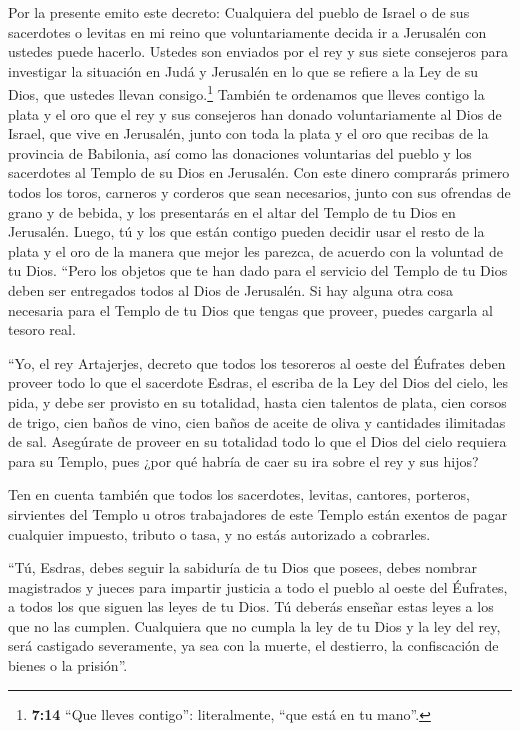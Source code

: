  Por la presente emito este decreto: Cualquiera del
pueblo de Israel o de sus sacerdotes o levitas en mi reino que
voluntariamente decida ir a Jerusalén con ustedes puede hacerlo.
 Ustedes son enviados por el rey y sus siete consejeros
para investigar la situación en Judá y Jerusalén en lo que se refiere a
la Ley de su Dios, que ustedes llevan consigo.\footnote{\textbf{7:14}
  ``Que lleves contigo'': literalmente, ``que está en tu mano''.}
 También te ordenamos que lleves contigo la plata y el
oro que el rey y sus consejeros han donado voluntariamente al Dios de
Israel, que vive en Jerusalén,  junto con toda la plata y
el oro que recibas de la provincia de Babilonia, así como las donaciones
voluntarias del pueblo y los sacerdotes al Templo de su Dios en
Jerusalén.  Con este dinero comprarás primero todos los
toros, carneros y corderos que sean necesarios, junto con sus ofrendas
de grano y de bebida, y los presentarás en el altar del Templo de tu
Dios en Jerusalén.  Luego, tú y los que están contigo
pueden decidir usar el resto de la plata y el oro de la manera que mejor
les parezca, de acuerdo con la voluntad de tu Dios. 
``Pero los objetos que te han dado para el servicio del Templo de tu
Dios deben ser entregados todos al Dios de Jerusalén.  Si
hay alguna otra cosa necesaria para el Templo de tu Dios que tengas que
proveer, puedes cargarla al tesoro real.

 ``Yo, el rey Artajerjes, decreto que todos los tesoreros
al oeste del Éufrates deben proveer todo lo que el sacerdote Esdras, el
escriba de la Ley del Dios del cielo, les pida, y debe ser provisto en
su totalidad,  hasta cien talentos de plata, cien corsos
de trigo, cien baños de vino, cien baños de aceite de oliva y cantidades
ilimitadas de sal.  Asegúrate de proveer en su totalidad
todo lo que el Dios del cielo requiera para su Templo, pues ¿por qué
habría de caer su ira sobre el rey y sus hijos?

 Ten en cuenta también que todos los sacerdotes, levitas,
cantores, porteros, sirvientes del Templo u otros trabajadores de este
Templo están exentos de pagar cualquier impuesto, tributo o tasa, y no
estás autorizado a cobrarles.

 ``Tú, Esdras, debes seguir la sabiduría de tu Dios que
posees, debes nombrar magistrados y jueces para impartir justicia a todo
el pueblo al oeste del Éufrates, a todos los que siguen las leyes de tu
Dios. Tú deberás enseñar estas leyes a los que no las cumplen.
 Cualquiera que no cumpla la ley de tu Dios y la ley del
rey, será castigado severamente, ya sea con la muerte, el destierro, la
confiscación de bienes o la prisión''.

